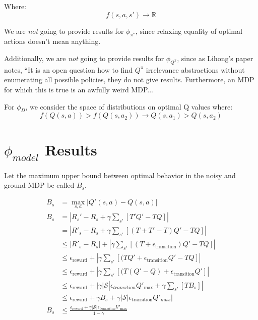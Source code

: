 \documentclass[11pt]{amsart}
\begin{document}
Where:
\begin{equation}
f(s,a,s') \rightarrow \mathbb{R}
\end{equation}


 We are {\it not} going to provide results for $\phi_{\pi^*}$, since relaxing equality of optimal actions doesn't mean anything.

 Additionally, we are {\it not} going to provide results for $\phi_{Q^\pi}$, since as Lihong's paper notes, ``It is an open question how to find $Q^\pi$ irrelevance abstractions without enumerating all possible policies, they do not give results. Furthermore, an MDP for which this is true is an awfully weird MDP...

 For $\phi_D$, we consider the space of distributions on optimal Q values where:
\begin{equation}
f(Q(s,a)) > f(Q(s,a_2)) \rightarrow Q(s,a_1) > Q(s,a_2)
\end{equation}

\newpage
\section{$\phi_{model}$ Results}

Let the maximum upper bound between optimal behavior in the noisy and ground MDP be called $B_s$.

\begin{align*}
B_{s} &= \max_{s,a}|Q'(s,a)-Q(s,a)|\\
B_{s} &= |R_s' - R_s + \gamma \sum_{s'}\left[T'Q'-TQ\right]|\\
&=|R'_s-R_s + \gamma \sum_{s'}\left[(T+T'-T)Q'-TQ\right]|\\
&\leq |R'_s-R_s|+|\gamma \sum_{s'}\left[(T+\epsilon_{\text{transition}})Q' - TQ\right]|\\
&\leq \epsilon_{\text{reward}}+|\gamma \sum_{s'}\left[(TQ'+\epsilon_{\text{transition}}Q' - TQ\right]|\\
&\leq \epsilon_{\text{reward}}+|\gamma \sum_{s'}\left[(T(Q'-Q)+\epsilon_{\text{transition}}Q' \right]|\\
&\leq \epsilon_{\text{reward}}+|\gamma |\mathcal{S}|\epsilon_{transition}Q'_{\text{max}} + \gamma \sum_{s'}\left[ T B_s\right]|\\
&\leq \epsilon_{\text{reward}} + \gamma B_{s} + \gamma |\mathcal{S}|\epsilon_{\text{transition}}Q'_{max}|\\
B_{s} &\leq 
\frac
{{\epsilon_{\text{reward}}} + \gamma |\mathcal{S}|\epsilon_{transition}V'_{\text{max}}}
{1-\gamma}
\end{align*}
\end{document}
